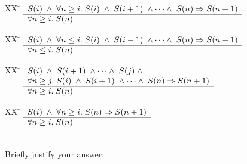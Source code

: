 \documentclass[addpoints]{exam}
\begin{document}
\begin{questions}
\begin{parts}
\begin{tabbing}
[a]XX \=  \kill
[a] \>
	\(\begin{array}[t]{l}
	S(i) \;\wedge\; \forall n \geq i.\;S(i)\;\wedge\;S(i+1)\;\wedge\cdots\wedge\;S(n) \Rightarrow S(n+1) \\
	\hline
	\forall n \geq i. \; S(n)
	\end{array}\)
\end{tabbing}

\begin{tabbing}
[b]XX \=  \kill
[b] \>
	\(\begin{array}[t]{l}
	S(i) \;\wedge\; \forall n \leq i.\;S(i)\;\wedge\;S(i-1)\;\wedge\cdots\wedge\;S(n) \Rightarrow S(n-1) \\
	\hline
	\forall n \leq i. \; S(n)
	\end{array}\)
\end{tabbing}


\begin{tabbing}
[c]XX \=  \kill
[c] \>
	\(\begin{array}[t]{l}
	S(i) \;\wedge\; S(i+1)\;\wedge\cdots\wedge\;S(j)\;\wedge\; \\
\forall n \geq j.\;S(i)\;\wedge\;S(i+1)\;\wedge\cdots\wedge\;S(n) \Rightarrow S(n+1) \\
	\hline
	\forall n \geq i. \; S(n)
	\end{array}\) %
\end{tabbing}

\begin{tabbing}
[d]XX \=  \kill
[d] \>
	\(\begin{array}[t]{l}
	S(i) \;\wedge\; \forall n \geq i.\;S(n) \Rightarrow S(n+1) \\
	\hline
	\forall n \geq i. \; S(n)
	\end{array}\) %
\end{tabbing}
~\\Briefly justify your answer:
\end{parts}




\vspace{25mm}
\clearpage



\vspace{25mm}



\vspace{25mm}


\end{questions}
\end{document}
